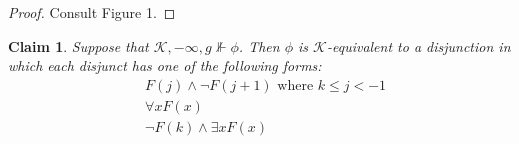 \documentclass[12pt]{article}
\newtheorem{claim}{Claim}
\begin{document}
\begin{proof}
    Consult Figure 1. 
\end{proof}

\begin{claim}\label{boundary}
    Suppose that $\mathcal{K},-\infty,g \nVdash \phi$. Then $\phi$ is $\mathcal{K}$-equivalent to a disjunction in which each disjunct has one of the following forms:
    \begin{align*}
        & F(j) \wedge \neg F(j+1) \text{ where } k \leq j <-1 \\
        & \forall x F(x) \\
        & \neg F(k) \wedge \exists x F(x)
    \end{align*}
\end{claim}
\end{document}
